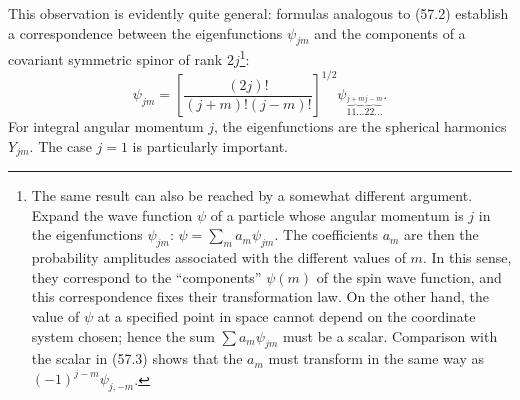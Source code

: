 This observation is evidently quite general: formulas analogous to (57.2)
establish a correspondence between the eigenfunctions $\psi_{jm}$ and the
components of a covariant symmetric spinor of rank $2j$\footnote{The same
result can also be reached by a somewhat different argument.  Expand the
wave function $\psi$ of a particle whose angular momentum is $j$ in the
eigenfunctions $\psi_{jm}$:
$\psi=\sum_m a_m\psi_{jm}$.  The coefficients $a_m$ are then the probability
amplitudes associated with the different values of $m$.  In this sense, they
correspond to the ``components'' $\psi(m)$ of the spin wave function, and
this correspondence fixes their transformation law.  On the other hand, the
value of $\psi$ at a specified point in space cannot depend on the coordinate
system chosen; hence the sum $\sum a_m\psi_{jm}$ must be a scalar.  Comparison
with the scalar in (57.3) shows that the $a_m$ must transform in the same way
as $(-1)^{j-m}\psi_{j,-m}$.}:
\begin{equation}
 \psi_{jm}=\left[\frac{(2j)!}{(j+m)!(j-m)!}\right]^{1/2}
 \psi_{\overbrace{11\ldots}^{j+m}\overbrace{22\ldots}^{j-m}}.
 \tag{57.6}
\end{equation}
For integral angular momentum $j$, the eigenfunctions are the spherical
harmonics $Y_{jm}$.  The case $j=1$ is particularly important.
